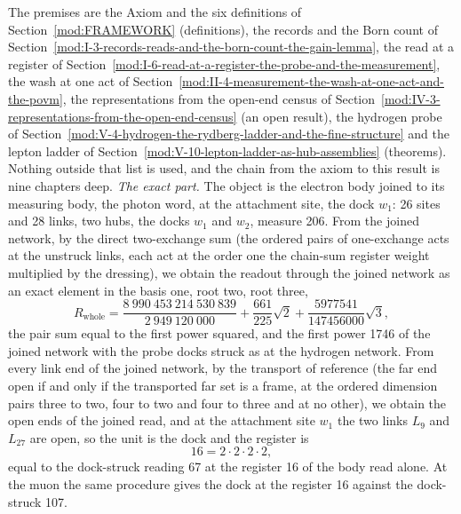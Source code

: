 \begin{chproof}
The premises are the Axiom and the six definitions of Section~\ref{mod:FRAMEWORK} (definitions), the records and the Born count of Section~\ref{mod:I-3-records-reads-and-the-born-count-the-gain-lemma}, the read at a register of Section~\ref{mod:I-6-read-at-a-register-the-probe-and-the-measurement}, the wash at one act of Section~\ref{mod:II-4-measurement-the-wash-at-one-act-and-the-povm}, the representations from the open-end census of Section~\ref{mod:IV-3-representations-from-the-open-end-census} (an open result), the hydrogen probe of Section~\ref{mod:V-4-hydrogen-the-rydberg-ladder-and-the-fine-structure} and the lepton ladder of Section~\ref{mod:V-10-lepton-ladder-as-hub-assemblies} (theorems). Nothing outside that list is used, and the chain from the axiom to this result is nine chapters deep.
\emph{The exact part.} The object is the electron body joined to its measuring body, the photon word, at the attachment site, the dock $w_1$: 26 sites and 28 links, two hubs, the docks $w_1$ and $w_2$, measure 206. From the joined network, by the direct two-exchange sum (the ordered pairs of one-exchange acts at the unstruck links, each act at the order one the chain-sum register weight multiplied by the dressing), we obtain the readout through the joined network as an exact element in the basis one, root two, root three,
\begin{equation}
R_{\mathrm{whole}} = \frac{8\ 990\ 453\ 214\ 530\ 839}{2\ 949\ 120\ 000} + \frac{661}{225}\sqrt{2} + \frac{5977541}{147456000}\sqrt{3} ,
\end{equation}
the pair sum equal to the first power squared, and the first power 1746 of the joined network with the probe docks struck as at the hydrogen network. From every link end of the joined network, by the transport of reference (the far end open if and only if the transported far set is a frame, at the ordered dimension pairs three to two, four to two and four to three and at no other), we obtain the open ends of the joined read, and at the attachment site $w_1$ the two links $L_{9}$ and $L_{27}$ are open, so the unit is the dock and the register is
\begin{equation}
16 = 2 \cdot 2 \cdot 2 \cdot 2 ,
\end{equation}
equal to the dock-struck reading 67 at the register 16 of the body read alone. At the muon the same procedure gives the dock at the register 16 against the dock-struck 107.

\end{chproof}
